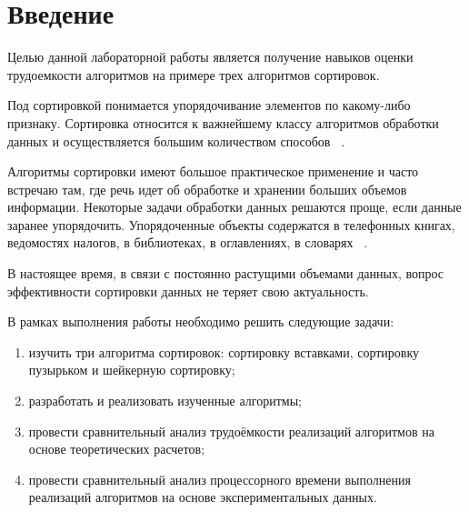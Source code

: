 \chapter*{Введение}

Целью данной лабораторной работы является получение навыков оценки трудоемкости алгоритмов на примере трех алгоритмов сортировок.

Под сортировкой понимается упорядочивание элементов по какому-либо признаку. Сортировка  относится  к  важнейшему  классу  алгоритмов  обработки данных и осуществляется большим количеством способов ~\cite{first_book}.

Алгоритмы сортировки имеют большое практическое применение и часто встречаю там, где речь идет об обработке и хранении больших объемов информации.  Некоторые задачи обработки данных решаются проще, если данные заранее упорядочить. Упорядоченные объекты содержатся в телефонных книгах, ведомостях налогов, в библиотеках, в оглавлениях, в словарях ~\cite{first_article}.


В настоящее время, в связи с постоянно растущими объемами данных, вопрос эффективности сортировки данных не теряет свою актуальность.



В рамках выполнения работы необходимо решить следующие задачи: 
\begin{enumerate}[label={\arabic*)}]
	\item изучить три алгоритма сортировок: сортировку вставками, сортировку пузырьком и шейкерную сортировку;
	\item разработать и реализовать изученные алгоритмы;
	\item провести сравнительный анализ трудоёмкости реализаций алгоритмов на основе теоретических расчетов;
	\item провести сравнительный анализ процессорного времени выполнения реализаций алгоритмов на основе экспериментальных данных.
\end{enumerate}
